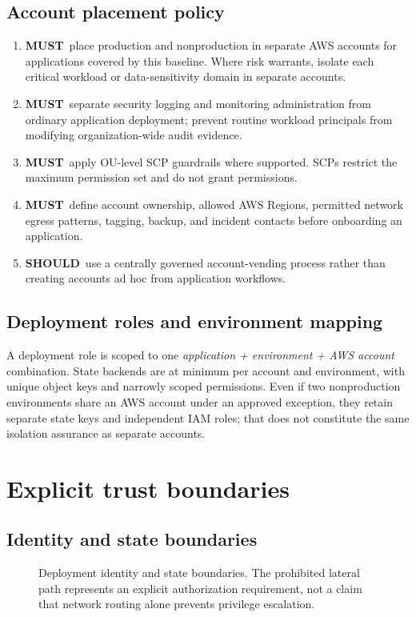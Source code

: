 \documentclass[10pt,letterpaper]{article}
\newcommand{\must}{\textbf{MUST}}
\newcommand{\should}{\textbf{SHOULD}}
\begin{document}
\subsection{Account placement policy}
\begin{enumerate}
\item \must\ place production and nonproduction in separate AWS accounts for applications covered by this baseline. Where risk warrants, isolate each critical workload or data-sensitivity domain in separate accounts.
\item \must\ separate security logging and monitoring administration from ordinary application deployment; prevent routine workload principals from modifying organization-wide audit evidence.
\item \must\ apply OU-level SCP guardrails where supported. SCPs restrict the maximum permission set and do not grant permissions.
\item \must\ define account ownership, allowed AWS Regions, permitted network egress patterns, tagging, backup, and incident contacts before onboarding an application.
\item \should\ use a centrally governed account-vending process rather than creating accounts ad hoc from application workflows.
\end{enumerate}
\subsection{Deployment roles and environment mapping}
A deployment role is scoped to one \emph{application + environment + AWS account} combination. State backends are at minimum per account and environment, with unique object keys and narrowly scoped permissions. Even if two nonproduction environments share an AWS account under an approved exception, they retain separate state keys and independent IAM roles; that does not constitute the same isolation assurance as separate accounts.

\section{Explicit trust boundaries}
\subsection{Identity and state boundaries}
\begin{figure}[htbp]\centering\resizebox{0.92\linewidth}{!}{}\caption{Deployment identity and state boundaries. The prohibited lateral path represents an explicit authorization requirement, not a claim that network routing alone prevents privilege escalation.}\end{figure}
\end{document}
